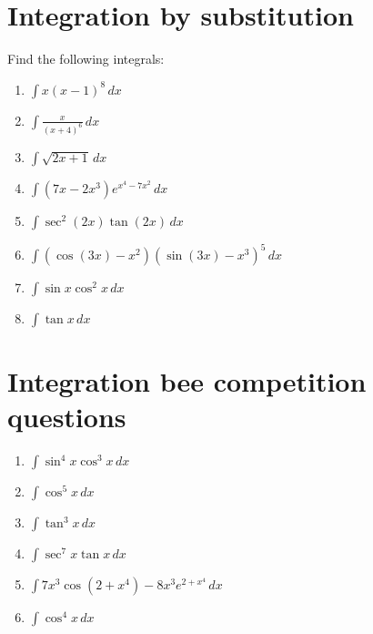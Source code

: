 \documentclass[12pt, letterpaper]{article}
\begin{document}
\setlength{\parskip}{10pt}

\section*{Integration by substitution}
Find the following integrals:

\begin{enumerate}[itemsep=2cm]
    \item $\int x(x-1)^8\,dx$
    
    \item $\int \frac{x}{(x+4)^6}\,dx$
    
    \item $\int \sqrt{2x+1}\,dx$
    
    \item $\int (7x-2x^3)e^{x^4-7x^2}\,dx$
    
    \item $\int \sec^2{(2x)}\tan{(2x)}\,dx$
    
    \item $\int (\cos{(3x)-x^2})(\sin{(3x)}-x^3)^5\,dx$
    
    \item $\int \sin{x}\cos^2{x}\,dx$
    
    \item $\int \tan{x}\,dx$
    

\end{enumerate}
\pagebreak
\section*{Integration bee competition questions}
\begin{enumerate}[itemsep=2cm]
    \item $\int \sin^4{x}\cos^3{x}\,dx$
    
    \item $\int \cos^5{x}\,dx$
    
    \item $\int \tan^3{x}\,dx$
    
    \item $\int \sec^7{x}\tan{x}\,dx$
    
    \item $\int 7x^3\cos{(2+x^4)}-8x^3e^{2+x^4}\,dx$
    
    \item $\int \cos^4{x}\,dx$
\end{enumerate}
\end{document}
